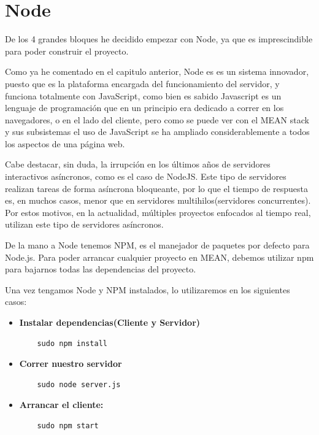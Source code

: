 \section{Node}

De los 4 grandes bloques he decidido empezar con Node, ya que es imprescindible para poder construir el proyecto.

Como ya he comentado en el capitulo anterior, Node es es un sistema innovador, puesto que es la plataforma encargada del funcionamiento del servidor, y funciona totalmente con JavaScript, como bien es sabido Javascript es un lenguaje de programación que en un principio era dedicado a correr en los navegadores, o en el lado del cliente, pero como se puede ver con el MEAN stack y sus subsistemas el uso de JavaScript se ha ampliado considerablemente a todos los aspectos de una página web.

Cabe destacar, sin duda, la irrupción en los últimos años de servidores interactivos asíncronos, como es el caso de NodeJS. Este tipo de servidores realizan tareas de forma asíncrona bloqueante, por lo que el tiempo de respuesta es, en muchos casos, menor que en servidores multihilos(servidores concurrentes). Por estos motivos, en la actualidad, múltiples proyectos enfocados al tiempo real, utilizan este tipo de servidores asíncronos.

De la mano a Node tenemos NPM, es el manejador de paquetes por defecto para Node.js. Para poder arrancar cualquier proyecto en MEAN, debemos utilizar npm para bajarnos todas las dependencias del proyecto. 

Una vez tengamos Node y NPM instalados, lo utilizaremos en los siguientes casos:

\begin{itemize}

\item \textbf{Instalar dependencias(Cliente y Servidor)}

\begin{lstlisting}
    sudo npm install
\end{lstlisting}

\item \textbf{Correr nuestro servidor}
\begin{lstlisting}
    sudo node server.js
\end{lstlisting}
    
\item \textbf{Arrancar el cliente: } 
\begin{lstlisting}
    sudo npm start
\end{lstlisting}
    
\end{itemize}

